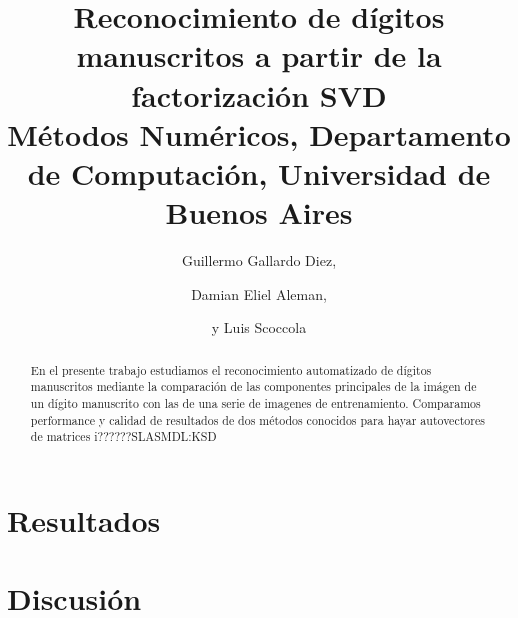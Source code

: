 \documentclass[%
	compressed,
	titlepage,
	narroweqnarray,
	inline,
	twoside,
	]{ieee}
\begin{document}
\title[Reconocimiento de d\'igitos manuscritos]{%
	Reconocimiento de d\'igitos manuscritos a partir de la factorizaci\'on SVD\\
{\small M\'etodos Num\'ericos, Departamento de Computaci\'on, Universidad de Buenos Aires}
}

\author[ALEMAN, G. DIEZ Y SCOCCOLA]{
Guillermo Gallardo Diez,\and{}Damian Eliel Aleman,\and{}y Luis Scoccola
}



\maketitle               
\tableofcontents

\newpage

\begin{abstract} 
	En el presente trabajo estudiamos el reconocimiento automatizado
	de d\'igitos manuscritos mediante la comparaci\'on de las componentes
	principales de la im\'agen de un d\'igito manuscrito con las de una
	serie de imagenes de entrenamiento.
	Comparamos performance y calidad de resultados de dos m\'etodos
	conocidos para hayar autovectores de matrices i??????SLASMDL:KSD
\end{abstract}

\begin{keywords}
\end{keywords}


 


\section{Resultados}



\section{Discusi\'on}
\end{document}
